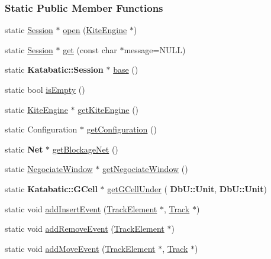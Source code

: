 \subsubsection*{Static Public Member Functions}
\begin{DoxyCompactItemize}
\item 
static \hyperlink{classKite_1_1Session}{Session} $\ast$ \hyperlink{classKite_1_1Session_ab8362982a442b5a67f5bd76d6b6caf93}{open} (\hyperlink{classKite_1_1KiteEngine}{Kite\+Engine} $\ast$)
\item 
static \hyperlink{classKite_1_1Session}{Session} $\ast$ \hyperlink{classKite_1_1Session_a76f17c3642eaeba85fa0af5ae9d208b4}{get} (const char $\ast$message=N\+U\+LL)
\item 
static \textbf{ Katabatic\+::\+Session} $\ast$ \hyperlink{classKite_1_1Session_a8a3fc782c34dc075bb2e14209e245494}{base} ()
\item 
static bool \hyperlink{classKite_1_1Session_af337ffd75e4f019ce15302c60715d84b}{is\+Empty} ()
\item 
static \hyperlink{classKite_1_1KiteEngine}{Kite\+Engine} $\ast$ \hyperlink{classKite_1_1Session_a7b6c91acd2c2a7c082b3b006c1bdc91d}{get\+Kite\+Engine} ()
\item 
static Configuration $\ast$ \hyperlink{classKite_1_1Session_a9a7fbadfe526875680f698c76adfb128}{get\+Configuration} ()
\item 
static \textbf{ Net} $\ast$ \hyperlink{classKite_1_1Session_aef6f41b0e8265ad574d1797f46ab9fa8}{get\+Blockage\+Net} ()
\item 
static \hyperlink{classKite_1_1NegociateWindow}{Negociate\+Window} $\ast$ \hyperlink{classKite_1_1Session_a39ebff178f2e0abb9d5a29f485e0bbab}{get\+Negociate\+Window} ()
\item 
static \textbf{ Katabatic\+::\+G\+Cell} $\ast$ \hyperlink{classKite_1_1Session_a27ecb1cf5ffabe1c7901c5c894a5067d}{get\+G\+Cell\+Under} (\textbf{ Db\+U\+::\+Unit}, \textbf{ Db\+U\+::\+Unit})
\item 
static void \hyperlink{classKite_1_1Session_ad4f08dfb62ce626ed72023ce02e7205f}{add\+Insert\+Event} (\hyperlink{classKite_1_1TrackElement}{Track\+Element} $\ast$, \hyperlink{classKite_1_1Track}{Track} $\ast$)
\item 
static void \hyperlink{classKite_1_1Session_aedd573fc951ed93f8ada5b0522813c3a}{add\+Remove\+Event} (\hyperlink{classKite_1_1TrackElement}{Track\+Element} $\ast$)
\item 
static void \hyperlink{classKite_1_1Session_aa42e4cb9e2559c00d68821f535ef7838}{add\+Move\+Event} (\hyperlink{classKite_1_1TrackElement}{Track\+Element} $\ast$, \hyperlink{classKite_1_1Track}{Track} $\ast$)

\end{DoxyCompactItemize}
